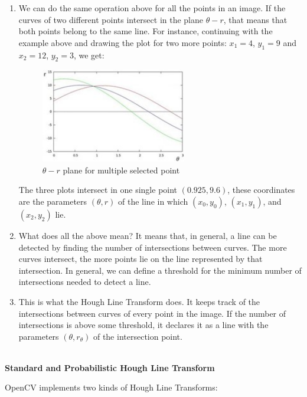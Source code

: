 \begin{enumerate}
    \item We can do the same operation above for all the points in an image. If the curves of two different points intersect in the plane \(\theta - r\), that means that both points belong to the same line. For instance, continuing with the example above and drawing the plot for two more points: \(x_1 = 4\), \(y_1 = 9\) and \(x_2 = 12\), \(y_2 = 3\), we get:
    \begin{figure}[h!]
     \centering
        \includegraphics[width=0.6\textwidth]{Picture3.jpg}
        \caption{\(\theta - r\) plane for multiple selected point}
        \label{fig}
    \end{figure}
    The three plots intersect in one single point \((0.925, 9.6)\), these coordinates are the parameters \((\theta, r)\) of the line in which \((x_0, y_0)\), \((x_1, y_1)\), and \((x_2, y_2)\) lie.
    
    \item What does all the above mean? It means that, in general, a line can be detected by finding the number of intersections between curves. The more curves intersect, the more points lie on the line represented by that intersection. In general, we can define a threshold for the minimum number of intersections needed to detect a line.
    
    \item This is what the Hough Line Transform does. It keeps track of the intersections between curves of every point in the image. If the number of intersections is above some threshold, it declares it as a line with the parameters \((\theta, r_\theta)\) of the intersection point.
\end{enumerate}\\

\textbf{Standard and Probabilistic Hough Line Transform\\}

OpenCV implements two kinds of Hough Line Transforms:\\

